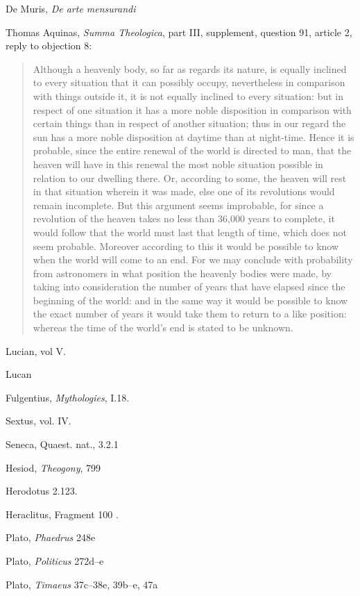 \documentclass{article}
\begin{document}
De Muris, {\em De arte mensurandi} \cite{mensurandi}

Thomas Aquinas, {\em Summa Theologica}, part III, supplement,
question 91, article 2, reply to objection 8:

\begin{quote}
Although a heavenly body, so far as regards its nature, is equally inclined to every situation that it can possibly occupy, nevertheless in comparison with things outside it, it is not
equally inclined to every situation: but in respect of one situation it has a more noble disposition in comparison with certain things than in respect of another situation; thus in our regard the sun has a more noble disposition at daytime than at night-time. Hence it is probable, since the entire renewal of the world is directed to man, that the heaven will have in this renewal the most noble situation possible in relation to our dwelling there. Or, according to some, the heaven will rest in that situation wherein it was made, else one of its revolutions would remain incomplete. But this argument seems improbable, for since a revolution of the heaven takes no less than 36,000 years to complete, it would follow that the world must last that length of time, which does not seem probable. Moreover according to this it would be possible to know when the world will come to an end. For we may conclude with probability from astronomers in what position the heavenly bodies were made, by taking into consideration the number of years that have elapsed since the beginning of the world: and in the same way it would be possible to know the exact number of years it would take them to return to a like position: whereas the time of the world's end is stated to be unknown.
\end{quote}

Lucian, vol V.

Lucan

Fulgentius, {\em Mythologies}, I.18.

Sextus, vol. IV.

Seneca, Quaest. nat., 3.2.1

Hesiod, {\em Theogony}, 799

Herodotus 2.123.

Heraclitus, Fragment 100 \cite[pp.~294--305]{heraclitus}. 

Plato, {\em Phaedrus} 248e

Plato, {\em Politicus} 272d--e

Plato, {\em Timaeus} 37c--38e, 39b--e, 47a \cite[pp.~97--106, 115--117, 157]{timaeus}
\end{document}
